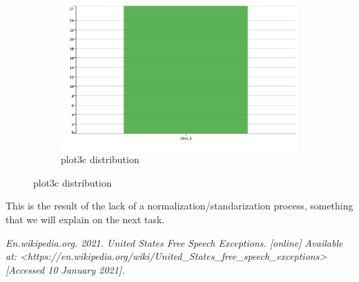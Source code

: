 \documentclass[12pt]{article}
\begin{document}
\begin{figure}[H]
\begin{subfigure}{0.4\textwidth}
				\includegraphics[width=\textwidth]{res/plot3cdist}
				\caption{plot3c distribution}
				\label{fig:third}
			\end{subfigure}
			
			\label{fig:figures}
		\end{figure}
		 This is the result of the lack of a normalization/standarization process, something that we will explain on the next task.
	
	
	 
	
	
		
	
	\pagebreak
	\begin{thebibliography}{1}	
		\textit{En.wikipedia.org. 2021. United States Free Speech Exceptions. [online] Available at: <https://en.wikipedia.org/wiki/United\_States\_free\_speech\_exceptions> [Accessed 10 January 2021].}
		
	\end{thebibliography}
\end{document}
